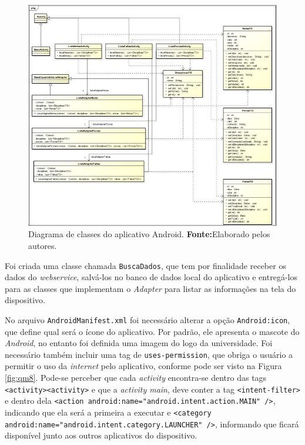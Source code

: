 		\begin{figure}[h!]
			\centerline{\includegraphics[scale=0.4]{./imagens/2_q_metodologico/qm7(1).png}}
			\caption[Diagrama de classes do aplicativo Android]{Diagrama de classes do aplicativo Android.
			 \textbf{Fonte:}Elaborado pelos autores.}
			\label{fig:qm7(1)}
		\end{figure}
		
		
	\par Foi criada uma classe chamada \texttt{BuscaDados}, que tem por finalidade
receber os dados do \textit{webservice}, salvá-los no banco de dados local do
aplicativo e entregá-los para as classes que implementam o \textit{Adapter}
para listar as informações na tela do dispositivo.
	
	\par No arquivo \texttt{AndroidManifest.xml} foi necessário alterar a opção
\texttt{Android:icon}, que define qual será o ícone do aplicativo. Por padrão,
ele apresenta o mascote do \textit{Android}, no entanto foi definida uma imagem
do logo da universidade. Foi necessário também incluir uma tag de
\texttt{uses-permission}, que obriga o usuário a permitir o uso da
\textit{internet} pelo aplicativo, conforme pode ser visto na Figura
\ref{fig:qm8}. Pode-se perceber que cada \textit{activity} encontra-se
dentro das tags \texttt{<activity><\/activity>} e que a \textit{activity main},
deve conter a tag \texttt{<intent-filter>} e dentro dela {\tiny{\texttt{<action
android:name="android.intent.action.MAIN" />}}}, indicando que
ela será a primeira a executar e {\tiny{\texttt{<category
android:name="android.intent.category.LAUNCHER" />}}}, informando que ficará
disponível junto aos outros aplicativos do dispositivo.
	

